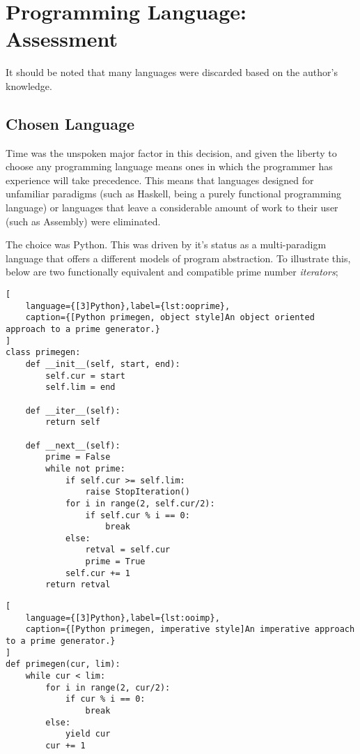 \documentclass[10pt,a4paper,notitlepage]{report}
\begin{document}
\section{Programming Language: Assessment}
It should be noted that many languages were discarded based on the author's knowledge. %

\subsection{Chosen Language}
Time was the unspoken major factor in this decision, and given the liberty to choose any programming language means ones in which the programmer has experience will take precedence. This means that languages designed for unfamiliar paradigms (such as Haskell, being a purely functional programming language\cite{haskfunc}) or languages that leave a considerable amount of work to their user (such as Assembly) were eliminated.

The choice was Python. This was driven by it's status as a multi-paradigm language that offers a different models of program abstraction.
To illustrate this, below are two functionally equivalent and compatible prime number \emph{iterators};
\begin{lstlisting}[
	language={[3]Python},label={lst:ooprime},
	caption={[Python primegen, object style]An object oriented approach to a prime generator.}
]
class primegen:
    def __init__(self, start, end):
        self.cur = start
        self.lim = end

    def __iter__(self):
        return self

    def __next__(self):
        prime = False
        while not prime:
            if self.cur >= self.lim:
                raise StopIteration()
            for i in range(2, self.cur/2):
                if self.cur % i == 0:
                    break
            else:
                retval = self.cur
                prime = True
            self.cur += 1
        return retval
\end{lstlisting}

\begin{lstlisting}[
	language={[3]Python},label={lst:ooimp},
	caption={[Python primegen, imperative style]An imperative approach to a prime generator.}
]
def primegen(cur, lim):
    while cur < lim:
        for i in range(2, cur/2):
            if cur % i == 0:
                break
        else:
            yield cur
        cur += 1

\end{lstlisting}
\end{document}

